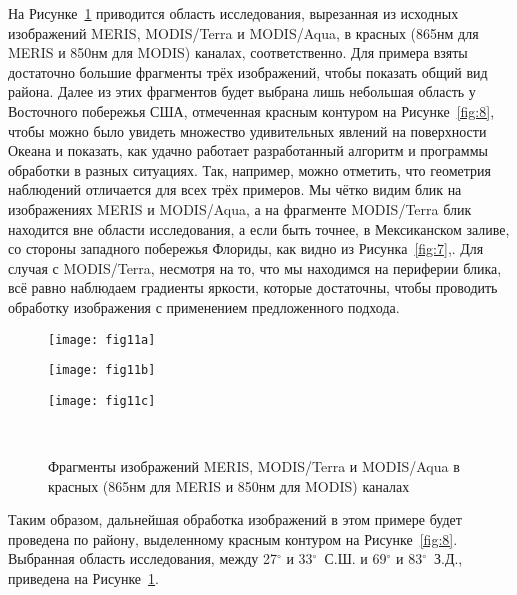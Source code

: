 На Рисунке~\ref{fig:11} приводится область исследования, вырезанная из исходных изображений MERIS, MODIS/Terra и MODIS/Aqua, в красных (865нм для MERIS и 850нм для MODIS) каналах, соответственно. Для примера взяты достаточно большие фрагменты трёх изображений, чтобы показать общий вид района. Далее из этих фрагментов будет выбрана лишь небольшая область у Восточного побережья США, отмеченная красным контуром на Рисунке~\ref{fig:8}, чтобы можно было увидеть множество удивительных явлений на поверхности Океана и показать, как удачно работает разработанный алгоритм и программы обработки в разных ситуациях. Так, например, можно отметить, что геометрия наблюдений отличается для всех трёх примеров. Мы чётко видим блик на изображениях MERIS и MODIS/Aqua, а на фрагменте MODIS/Terra блик находится вне области исследования, а если быть точнее, в Мексиканском заливе, со стороны западного побережья Флориды, как видно из Рисунка~\ref{fig:7},. Для случая с MODIS/Terra, несмотря на то, что мы находимся на периферии блика, всё равно наблюдаем градиенты яркости, которые достаточны, чтобы проводить обработку изображения с применением предложенного подхода.



\begin{figure}[H]
    	\centering
	\begin{minipage}{.31\textwidth}
	    \subcaptionbox{\label{fig:11a}}
		{\texttt{[image: fig11a]}}
	\end{minipage}
	\hfill
	\begin{minipage}{.31\textwidth}
	    \subcaptionbox{\label{fig:11b}}
		{\texttt{[image: fig11b]}}
	\end{minipage}
	\hfill
	\begin{minipage}{.31\textwidth}
	    \subcaptionbox{\label{fig:11c}}
		{\texttt{[image: fig11c]}}
	\end{minipage}
	\\
    \caption{Фрагменты изображений MERIS, MODIS/Terra и MODIS/Aqua в красных (865нм для MERIS и 850нм для MODIS) каналах}
    \label{fig:11}
\end{figure}

Таким образом, дальнейшая обработка изображений в этом примере будет проведена по району, выделенному красным контуром на Рисунке~\ref{fig:8}. Выбранная область исследования, между 27${}^\circ$ и 33${}^\circ$~С.Ш. и 69${}^\circ$ и 83${}^\circ$~З.Д., приведена на Рисунке~\ref{fig:11}.

